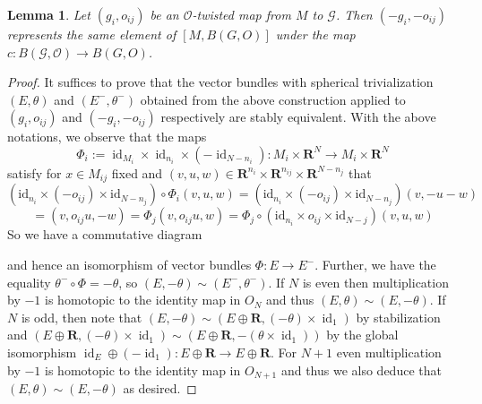 \documentclass[reqno]{amsart}
\newcommand{\THOMAS}[1]%
	{\begin{quotation}{\footnotesize\textcolor{brown}{\textbf{Thomas:} #1}}\end{quotation}}
\theoremstyle{theorem}
\newtheorem{lemma}[corollary]{Lemma}
\theoremstyle{remark}
\theoremstyle{definition}
\newcommand{\bR}{\mathbf{R}}
\newcommand{\R}{\mathbf{R}}
\newcommand{\GG}{\mathcal{G}}
\newcommand{\OO}{\mathcal{O}}
\DeclareMathOperator{\id}{id}
\begin{document}
 \begin{lemma}\label{lem:minusone}
Let $(g_i,o_{ij})$ be an $\OO$-twisted map from $M$ to $\GG$. Then $(-g_i,-o_{ij})$ represents
the same element of $[M,B(G,O)]$ under the map $c:B(\GG,\OO)\to B(G,O)$.
\end{lemma}
\begin{proof}
It suffices to prove that the vector bundles with spherical trivialization $(E,\theta)$ and $(E^-,\theta^-)$
obtained from the above construction applied to $(g_i,o_{ij})$ and $(-g_i,-o_{ij})$ respectively
are stably equivalent. With the above notations, we observe that the maps
\[ \Phi_i:= \id_{M_i}\times \id_{n_i}\times (-\id_{N-n_i}) : M_i\times \R^N\to M_i\times \R^N\]
satisfy for $x \in M_{ij}$ fixed and $(v,u,w) \in \bR^{n_i} \times \bR^{n_{ij} } \times \bR^{N-n_j}$ that
$$ (\text{id}_{n_i} \times (-o_{ij} ) \times \text{id}_{N-n_j} ) \circ \Phi_i(v,u,w) = 
 (\text{id}_{n_i} \times (-o_{ij} ) \times \text{id}_{N-n_j} )(v,-u-w)$$ $$
= (v,o_{ij}u,-w)
=\Phi_j(v,o_{ij}u,w)
= \Phi_j \circ ( \text{id}_{n_i} \times o_{ij} \times \text{id}_{N-j} )(v,u,w)
$$
So we have a commutative diagram
  \begin{center}
  \end{center}
  and hence an isomorphism of vector bundles $\Phi:E \to E^-$. Further, we have the equality $\theta^-\circ\Phi=-\theta$,
so $(E,-\theta)\sim (E^-,\theta^-)$. If $N$ is even then multiplication by $-1$ is homotopic to the identity map in $O_N$ and thus
$(E,\theta)\sim (E,-\theta)$. If $N$ is odd, then note that $(E,-\theta)\sim (E\oplus \R, (-\theta) \times \id_1)$ by stabilization and 
$ (E\oplus \R, (-\theta) \times \id_1) \sim (E\oplus \R, - ( \theta \times \id_1) )$ by the global isomorphism $\id_E \oplus (-\id_1) : E \oplus \bR \to E \oplus \R$. For $N+1$ even multiplication by $-1$ is homotopic to the identity map in $O_{N+1}$ and thus we also deduce that $(E,\theta)\sim (E,-\theta)$ as desired.
\end{proof}
\end{document}
